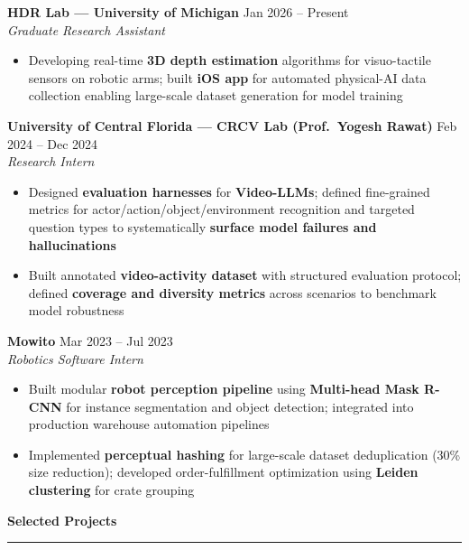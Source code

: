 \documentclass[9pt]{article}
\newcommand{\sect}[1]{\vspace{4pt}\noindent\textbf{\large #1}\vspace{3pt}\hrule\vspace{6pt}}
\begin{document}
\vspace{-1mm}
\textbf{HDR Lab --- University of Michigan} \hfill Jan 2026 -- Present\\
\emph{Graduate Research Assistant}
\vspace{-2mm}
\begin{itemize}[leftmargin=*,noitemsep,topsep=1pt]
  \item Developing real-time \textbf{3D depth estimation} algorithms for visuo-tactile sensors on robotic arms; built \textbf{iOS app} for automated physical-AI data collection enabling large-scale dataset generation for model training
\end{itemize}

\vspace{-1mm}
\textbf{University of Central Florida --- CRCV Lab (Prof.\ Yogesh Rawat)} \hfill Feb 2024 -- Dec 2024\\
\emph{Research Intern}
\vspace{-2mm}
\begin{itemize}[leftmargin=*,noitemsep,topsep=1pt]
  \item Designed \textbf{evaluation harnesses} for \textbf{Video-LLMs}; defined fine-grained metrics for actor/action/object/environment recognition and targeted question types to systematically \textbf{surface model failures and hallucinations}
  \item Built annotated \textbf{video-activity dataset} with structured evaluation protocol; defined \textbf{coverage and diversity metrics} across scenarios to benchmark model robustness
\end{itemize}

\vspace{-1mm}
\textbf{Mowito} \hfill Mar 2023 -- Jul 2023\\
\emph{Robotics Software Intern}
\vspace{-2mm}
\begin{itemize}[leftmargin=*,noitemsep,topsep=1pt]
  \item Built modular \textbf{robot perception pipeline} using \textbf{Multi-head Mask R-CNN} for instance segmentation and object detection; integrated into production warehouse automation pipelines
  \item Implemented \textbf{perceptual hashing} for large-scale dataset deduplication (30\% size reduction); developed order-fulfillment optimization using \textbf{Leiden clustering} for crate grouping
\end{itemize}

\sect{Selected Projects}
\end{document}
